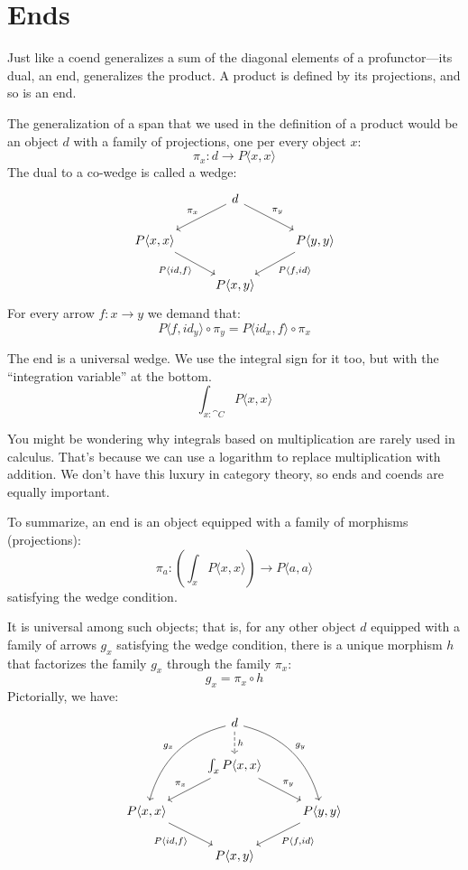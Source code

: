 \documentclass[DaoFP]{subfiles}
\begin{document}
\section{Ends}

Just like a coend generalizes a sum of the diagonal elements of a profunctor---its dual, an end, generalizes the product. A product is defined by its projections, and so is an end. 

The generalization of a span that we used in the definition of a product would be an object $d$ with a family of projections, one per every object $x$:
\[ \pi_x \colon d \to P \langle x, x \rangle \]
The dual to a co-wedge is called a wedge:
\[
 \begin{tikzcd}
 &d
 \arrow[ld, "\pi_x"']
 \arrow[rd, "\pi_y"]
 \\
 P \langle x, x \rangle
 \arrow[dr, "{P \langle id, f \rangle}"']
 &&P \langle y, y \rangle
 \arrow[dl, "{P \langle f, id \rangle}"]
 \\
 & P \langle x, y \rangle
 \end{tikzcd}
\]
For every arrow $f \colon x \to y$ we demand that:
\[ P \langle f, id_y \rangle \circ \pi_y = P \langle id_x, f \rangle \circ \pi_x \]

The end is a universal wedge. We use the integral sign for it too, but with the ``integration variable'' at the bottom. 
\[ \int_{x \colon \cat C} P \langle x, x \rangle \]

You might be wondering why integrals based on multiplication are rarely used in calculus. That's because we can use a logarithm to replace multiplication with addition. We don't have this luxury in category theory, so ends and coends are equally important.

To summarize, an end is an object equipped with a family of morphisms (projections):
\[ \pi_a \colon \left( \int_x P \langle x, x \rangle \right) \to P \langle a, a \rangle \]
satisfying the wedge condition. 

It is universal among such objects; that is, for any other object $d$ equipped with a family of arrows $g_x$ satisfying the wedge condition, there is a unique morphism $h$ that factorizes the family $g_x$ through the family $\pi_x$:
\[ g_x = \pi_x \circ h \]
Pictorially, we have:
\[
 \begin{tikzcd}
 &d
 \arrow[ddl, bend right, "g_x"']
 \arrow[ddr, bend left, "g_y"]
 \arrow[d, dashed, "h"]
 \\
 & \int_x P \langle x, x \rangle
 \arrow[ld, "\pi_x"']
 \arrow[rd, "\pi_y"]
 \\
 P \langle x, x \rangle
 \arrow[dr, "{P \langle id, f \rangle}"']
 &&P \langle y, y \rangle
 \arrow[dl, "{P \langle f, id \rangle}"]
 \\
 & P \langle x, y \rangle
 \end{tikzcd}
\]
\end{document}
